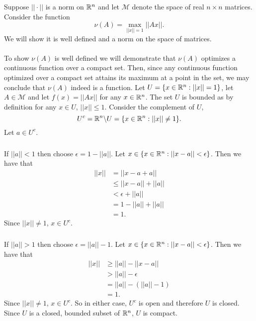 \documentclass[letterpaper,12pt,oneside,onecolumn]{article}
\newcommand{\cM}{\mathcal{M}} \newcommand{\cN}{\mathcal{N}}
\begin{document}
\section{}
\paragraph{}
Suppose $||\cdot||$ is a norm on $\mathbb{R}^n$ and let $\cM$ denote the space of real $n \times n$ matrices. Consider the function $$\nu(A) = \max_{||x||=1} ||Ax||.$$
We will show it is well defined and a norm on the space of matrices.
\paragraph{}
To show $\nu(A)$ is well defined we will demonstrate that $\nu(A)$ optimizes a continuous function over a compact set. Then, since any continuous function optimized over a compact set attains its maximum at a point in the set, we may conclude that $\nu(A)$ indeed is a function. Let $U = \{x \in \mathbb{R}^n: ||x|| = 1\}$, let $A\in \cM$ and let $f(x) = ||Ax||$ for any $x \in \mathbb{R}^n$. The set $U$ is bounded as by definition for any $x \in U$, $||x|| \leq 1$. Consider the complement of $U$, $$U^c = \mathbb{R}^n \backslash U = \{x \in \mathbb{R}^n: ||x|| \neq 1\}.$$ Let $a \in U^c$.
\subparagraph{}
If $||a|| < 1$ then choose $\epsilon = 1 - ||a||$. Let $x \in \{x \in \mathbb{R}^n: ||x-a|| < \epsilon\}$. Then we have that
\begin{align*}
||x|| &= ||x-a + a|| \\
&\leq ||x-a|| + ||a|| \\
&< \epsilon + ||a|| \\
&= 1 - ||a|| + ||a|| \\
&= 1.
\end{align*} 
Since $||x|| \neq 1$, $x\in U^c$.
\subparagraph{}
If $||a|| > 1$ then choose $\epsilon = ||a|| - 1$. Let $x \in \{x \in \mathbb{R}^n: ||x-a|| < \epsilon\}$. Then we have that
\begin{align*}
||x|| &\geq ||a|| - ||x-a|| \\
&> ||a|| - \epsilon \\
&= ||a|| -(||a|| - 1) \\
&= 1.
\end{align*}
Since $||x|| \neq 1$, $x \in U^c$. So in either case, $U^c$ is open and therefore $U$ is closed. 
Since $U$ is a closed, bounded subset of $\mathbb{R}^n$, $U$ is compact.
\end{document}
